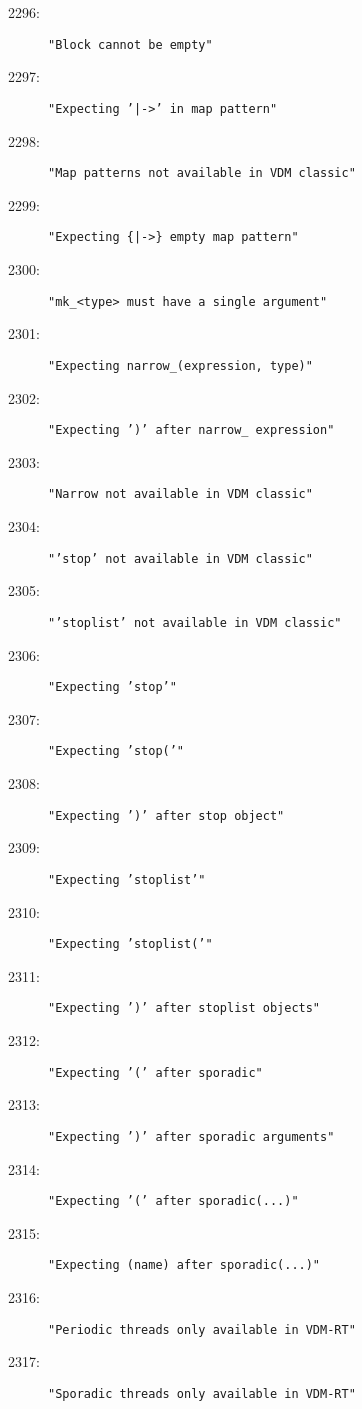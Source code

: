 \begin{description}
\item[2296:] \texttt{"Block cannot be empty"}
\item[2297:] \texttt{"Expecting '|->' in map pattern"}
\item[2298:] \texttt{"Map patterns not available in VDM classic"}
\item[2299:] \texttt{"Expecting \{|->\} empty map pattern"}
\item[2300:] \texttt{"mk\_<type> must have a single argument"}
\item[2301:] \texttt{"Expecting narrow\_(expression, type)"}
\item[2302:] \texttt{"Expecting ')' after narrow\_ expression"}
\item[2303:] \texttt{"Narrow not available in VDM classic"}
\item[2304:] \texttt{"'stop' not available in VDM classic"}
\item[2305:] \texttt{"'stoplist' not available in VDM classic"}
\item[2306:] \texttt{"Expecting 'stop'"}
\item[2307:] \texttt{"Expecting 'stop('"}
\item[2308:] \texttt{"Expecting ')' after stop object"}
\item[2309:] \texttt{"Expecting 'stoplist'"}
\item[2310:] \texttt{"Expecting 'stoplist('"}
\item[2311:] \texttt{"Expecting ')' after stoplist objects"}
\item[2312:] \texttt{"Expecting '(' after sporadic"}
\item[2313:] \texttt{"Expecting ')' after sporadic arguments"}
\item[2314:] \texttt{"Expecting '(' after sporadic(...)"}
\item[2315:] \texttt{"Expecting (name) after sporadic(...)"}
\item[2316:] \texttt{"Periodic threads only available in VDM-RT"}
\item[2317:] \texttt{"Sporadic threads only available in VDM-RT"}

\end{description}
